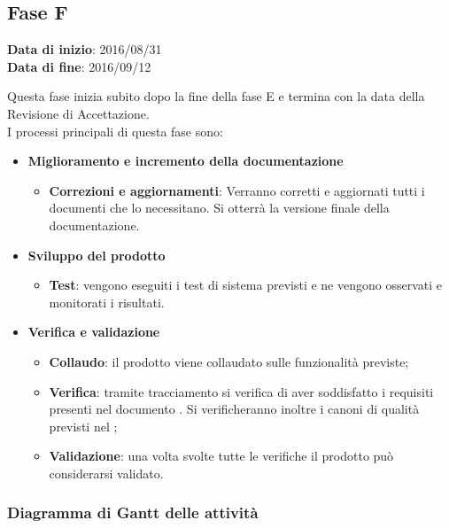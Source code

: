 	\subsection{Fase F}
	\begin{center}
		\textbf{Data di inizio}: 2016/08/31 \\
		\textbf{Data di fine}: 2016/09/12 \\
	\end{center}
	Questa fase inizia subito dopo la fine della fase E e termina con la data della Revisione di Accettazione. \\
	I processi principali di questa fase sono:
		\begin{itemize}
			\item \textbf{Miglioramento e incremento della documentazione}
			\att
			\begin{itemize}
				\item \textbf{Correzioni e aggiornamenti}: Verranno corretti e aggiornati tutti i documenti che lo necessitano. Si otterrà la versione finale della documentazione. 
			\end{itemize}
			\item \textbf{Sviluppo del prodotto}
			\att
				\begin{itemize}
					\item \textbf{Test}: vengono eseguiti i test di sistema previsti e ne vengono osservati e monitorati i risultati. 
				\end{itemize}
			\item \textbf{Verifica e validazione}
			\att
			\begin{itemize}
				\item \textbf{Collaudo}: il prodotto viene collaudato sulle funzionalità previste;
				\item \textbf{Verifica}: tramite tracciamento si verifica di aver soddisfatto i requisiti presenti nel documento \ARdocRA. Si verificheranno inoltre i canoni di qualità previsti nel \PQdocRA;
				\item \textbf{Validazione}: una volta svolte tutte le verifiche il prodotto può considerarsi validato.
			\end{itemize}
		\end{itemize}
		\subsubsection{Diagramma di Gantt delle attività}
		
